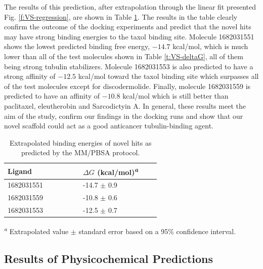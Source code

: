 \documentclass[11pt]{report}
\begin{document}
The results of this prediction, after extrapolation through the linear fit presented 
Fig. \ref{f:VS-regression}, are shown in 
Table \ref{t:VS-hitdG}. 
The results in the table clearly confirm the outcome of the docking experiments and predict that the novel hits may have strong binding energies to the taxol binding site. Molecule 1682031551 shows the lowest predicted binding free energy, $-14.7$ 
kcal/mol, which is much lower than all of the test molecules shown in 
Table \ref{t:VS-deltaG}, all of them being strong tubulin stabilizers. 
Molecule 1682031553 is also predicted to have a strong affinity of $-12.5$ kcal/mol toward the taxol binding site which surpasses all of the test molecules except for discodermolide. Finally, molecule 1682031559 is predicted to have an affinity of $-10.8$ kcal/mol which is still better than paclitaxel,
eleutherobin and Sarcodictyin A. In general, these results meet the aim of the study, confirm our findings in the docking runs and show that our novel scaffold could act as a good anticancer tubulin-binding agent.
\begin{table}[h]
  \centering
  \caption[Extrapolated binding energies of novel hits]{Extrapolated binding energies of novel hits as predicted by the
  MM/PBSA protocol.}
  \label{t:VS-hitdG}
  \begin{tabular}{p{0.3\linewidth}p{0.3\linewidth}}
   \toprule
   Ligand & $\Delta{G}$ (kcal/mol)\textsuperscript{\emph{a}} \\
   \midrule
   1682031551 & -14.7 $\pm$ 0.9 \\
   1682031559 & -10.8 $\pm$ 0.6 \\
   1682031553 & -12.5 $\pm$ 0.7 \\
   \bottomrule
  \end{tabular}
  
  \textsuperscript{\emph{a}} Extrapolated value $\pm$ standard error based
  on a 95\% confidence interval.
\end{table}

\subsection{Results of Physicochemical Predictions}
\end{document}
